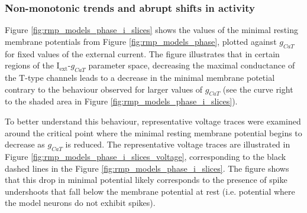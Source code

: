 \documentclass[../main.tex]{subfiles}
\begin{document}




\subsubsection{Non-monotonic trends and abrupt shifts in activity}

Figure \ref{fig:rmp_models_phase_i_slices} shows the values of the minimal resting membrane potentials from Figure \ref{fig:rmp_models_phase}, plotted against $g_{CaT}$ for fixed values of the external current. The figure illustrates that in certain regions of the I$_{\text{ext}}$-$g_{CaT}$ parameter space, decreasing the maximal conductance of the T-type channels leads to a decrease in the minimal membrane potetial contrary to the behaviour observed for larger values of $g_{CaT}$ (see the curve right to the shaded area in Figure \ref{fig:rmp_models_phase_i_slices}).

To better understand this behaviour, representative voltage traces were examined around the critical point where the minimal resting membrane potential begins to decrease as $g_{CaT}$ is reduced. The representative voltage traces are illustrated in Figure \ref{fig:rmp_models_phase_i_slices_voltage}, corresponding to the black dashed lines in the Figure \ref{fig:rmp_models_phase_i_slices}. The figure shows that this drop in minimal potential likely corresponds to the presence of spike undershoots that fall below the membrane potential at rest (i.e. potential where the model neurons do not exhibit spikes).
\end{document}
